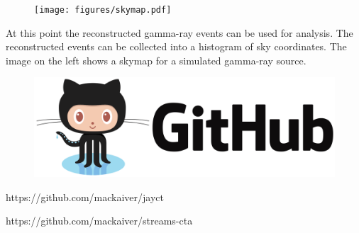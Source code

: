\begin{multicols}{2}
\begin{center}
        \begin{streamblock}[equal height group=C, width=0.8\linewidth]{-5mm}{0}{}%
          \begin{multicols}{2}
            \begin{figure}
              \texttt{[image: figures/skymap.pdf]}
            \end{figure}
            \columnbreak
            At this point the reconstructed gamma-ray events can be used for analysis.
            The reconstructed events can be collected into a histogram of sky coordinates.
            The image on the left shows a skymap for a simulated gamma-ray source.
          \end{multicols}
        \end{streamblock}%
        \vspace{3cm}
        \begin{multicols}{2}
            \begin{figure}
              \includegraphics[width=\linewidth]{logos/github.png}
            \end{figure}
            \columnbreak
                \vspace*{2cm}

                https://github.com/mackaiver/jayct


                https://github.com/mackaiver/streams-cta
          \end{multicols}


      \end{center}

\end{multicols}


